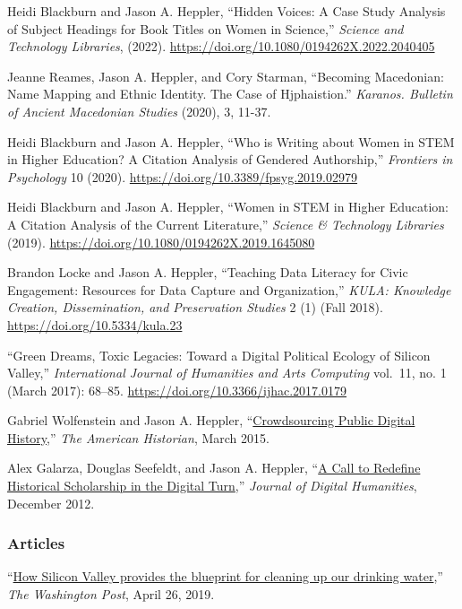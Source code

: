 Heidi Blackburn and Jason A. Heppler, ``Hidden Voices: A Case Study
Analysis of Subject Headings for Book Titles on Women in Science,''
\emph{Science and Technology Libraries}, (2022).
\url{https://doi.org/10.1080/0194262X.2022.2040405}

Jeanne Reames, Jason A. Heppler, and Cory Starman, ``Becoming
Macedonian: Name Mapping and Ethnic Identity. The Case of Hjphaistion.''
\emph{Karanos. Bulletin of Ancient Macedonian Studies} (2020), 3, 11-37.

Heidi Blackburn and Jason A. Heppler, ``Who is Writing about Women in
STEM in Higher Education? A Citation Analysis of Gendered Authorship,''
\emph{Frontiers in Psychology} 10 (2020).
\url{https://doi.org/10.3389/fpsyg.2019.02979}

Heidi Blackburn and Jason A. Heppler, ``Women in STEM in Higher
Education: A Citation Analysis of the Current Literature,''
\emph{Science \& Technology Libraries} (2019).
\url{https://doi.org/10.1080/0194262X.2019.1645080}

Brandon Locke and Jason A. Heppler, ``Teaching Data Literacy for Civic
Engagement: Resources for Data Capture and Organization,'' \emph{KULA:
Knowledge Creation, Dissemination, and Preservation Studies} 2 (1) (Fall
2018). \url{https://doi.org/10.5334/kula.23}

``Green Dreams, Toxic Legacies: Toward a Digital Political Ecology of
Silicon Valley,'' \emph{International Journal of Humanities and Arts
Computing} vol.~11, no. 1 (March 2017): 68--85.
\url{https://doi.org/10.3366/ijhac.2017.0179}

Gabriel Wolfenstein and Jason A. Heppler,
``\href{http://tah.oah.org/content/crowdsourcing-digital-public-history/}{Crowdsourcing
Public Digital History},'' \emph{The American Historian}, March 2015.

Alex Galarza, Douglas Seefeldt, and Jason A. Heppler,
``\href{http://journalofdigitalhumanities.org/1-4/a-call-to-redefine-historical-scholarship-in-the-digital-turn/}{A
Call to Redefine Historical Scholarship in the Digital Turn},''
\emph{Journal of Digital Humanities}, December 2012.

\hypertarget{articles}{%
\subsubsection{Articles}\label{articles}}

``\href{https://www.washingtonpost.com/outlook/2019/04/26/how-silicon-valley-provides-blueprint-cleaning-up-our-drinking-water/}{How
Silicon Valley provides the blueprint for cleaning up our drinking
water},'' \emph{The Washington Post}, April 26, 2019.

